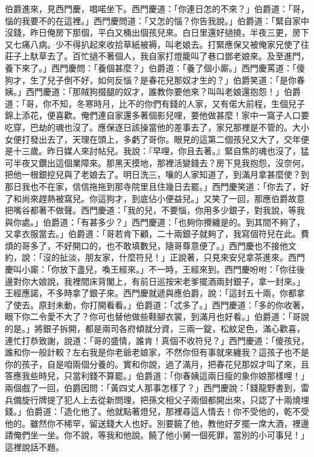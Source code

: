 伯爵進來，見西門慶，唱喏坐下。西門慶道：「你連日怎的不來？」伯爵道：「哥，惱的我要不的在這裡。」西門慶問道：「又怎的惱？你告我說。」伯爵道：「緊自家中沒錢，昨日俺房下那個，平白又桶出個孩兒來。白日里還好撾撓，半夜三更，房下又七痛八病。少不得扒起來收拾草紙被褥，叫老娘去。打緊應保又被俺家兄使了往莊子上馱草去了。百忙撾不著個人，我自家打燈籠叫了巷口鄧老娘來。及至進門，養下來了。」西門慶問：「養個甚麼？」伯爵道：「養了個小廝。」西門慶罵道：「傻狗才，生了兒子倒不好，如何反惱？是春花兒那奴才生的？」伯爵笑道：「是你春姨。」西門慶道：「那賊狗掇腿的奴才，誰教你要他來？叫叫老娘還抱怨！」伯爵道：「哥，你不知，冬寒時月，比不的你們有錢的人家，又有偌大前程，生個兒子錦上添花，便喜歡。俺們連自家還多著個影兒哩，要他做甚麼！家中一窩子人口要吃穿，巴劫的魂也沒了。應保逐日該操當他的差事去了，家兄那裡是不管的。大小女便打發出去了，天理在頭上，多虧了哥你。眼見的這第二個孩兒又大了，交年便是十三歲。昨日媒人來討帖兒。我說：『早哩，你且去著。』緊自焦的魂也沒了，猛可半夜又鑽出這個業障來。那黑天摸地，那裡活變錢去？房下見我抱怨，沒奈何，把他一根銀挖兒與了老娘去了。明日洗三，嚷的人家知道了，到滿月拿甚麼使？到那日我也不在家，信信拖拖到那寺院里且住幾日去罷。」西門慶笑道：「你去了，好了和尚來趕熱被窩兒。你這狗才，到底佔小便益兒。」又笑了一回，那應伯爵故意把嘴谷都著不做聲。西門慶道：「我的兒，不要惱，你用多少銀子，對我說，等我與你處。」伯爵道：「有甚多少？」西門慶道：「也夠你攪纏是的。到其間不夠了，又拿衣服當去。」伯爵道：「哥若肯下顧，二十兩銀子就夠了，我寫個符兒在此。費煩的哥多了，不好開口的，也不敢填數兒，隨哥尊意便了。」西門慶也不接他文約，說：「沒的扯淡，朋友家，什麼符兒！」正說著，只見來安兒拿茶進來。西門慶叫小廝：「你放下盞兒，喚王經來。」不一時，王經來到。西門慶吩咐：「你往後邊對你大娘說，我裡間床背閣上，有前日巡按宋老爹擺酒兩封銀子，拿一封來。」王經應諾，不多時拿了銀子來。西門慶就遞與應伯爵，說：「這封五十兩，你都拿了使去。原封未動，你打開看看。」伯爵道：「忒多了。」西門慶道：「多的你收著，眼下你二令愛不大了？你可也替他做些鞋腳衣裳，到滿月也好看。」伯爵道：「哥說的是。」將銀子拆開，都是兩司各府傾就分資，三兩一錠，松紋足色，滿心歡喜，連忙打恭致謝，說道：「哥的盛情，誰肯！真個不收符兒？」西門慶道：「傻孩兒，誰和你一般計較？左右我是你老爺老娘家，不然你但有事就來纏我？這孩子也不是你的孩子，自是咱兩個分養的。實和你說，過了滿月，把春花兒那奴才叫了來，且答應我些時兒，只當利錢不算罷。」伯爵道：「你春姨這兩日瘦的象你娘那樣哩！」兩個戲了一回，伯爵因問：「黃四丈人那事怎樣了？」西門慶說：「錢龍野書到，雷兵備旋行牌提了犯人上去從新問理，把孫文相父子兩個都開出來，只認了十兩燒埋錢。」伯爵道：「造化他了。他就點著燈兒，那裡尋這人情去！你不受他的，乾不受他的。雖然你不稀罕，留送錢大人也好。別要饒了他，教他好歹擺一席大酒，裡邊請俺們坐一坐。你不說，等我和他說。饒了他小舅一個死罪，當別的小可事兒！」這裡說話不題。

